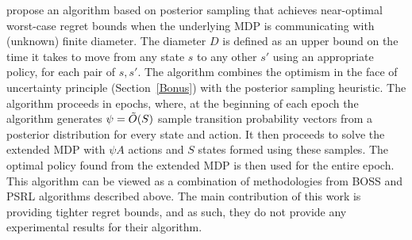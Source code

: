  propose an algorithm based on posterior sampling that achieves near-optimal worst-case regret bounds when the underlying MDP is communicating with (unknown) finite diameter. The diameter $D$ is defined as an upper bound on the time it takes to move from any state $s$ to any other $s'$ using an appropriate policy, for each pair of $s, s'$. The algorithm combines the optimism in the face of uncertainty principle (Section~\ref{Bonus}) with the posterior sampling heuristic. The algorithm proceeds in epochs, where, at the beginning of each epoch the algorithm generates $\psi = \Tilde{O}(S)$ sample transition probability vectors from a posterior distribution for every state and action. It then proceeds to solve the extended MDP with $\psi A$ actions and $S$ states formed using these samples. The optimal policy found from the extended MDP is then used for the entire epoch. This algorithm can be viewed as a combination of methodologies from BOSS and PSRL algorithms described above. The main contribution of this work is providing tighter regret bounds, and as such, they do not provide any experimental results for their algorithm.

